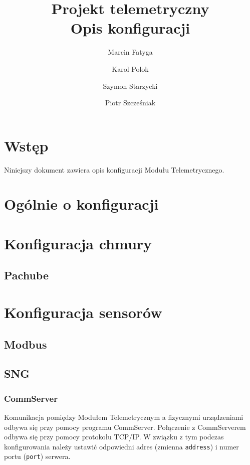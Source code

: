 \documentclass[11pt]{article}
\title{Projekt telemetryczny \\ Opis konfiguracji}
\author{Marcin Fatyga \and Karol Polok \and Szymon Starzycki \and Piotr Szcześniak}
\begin{document}
\begin{titlepage}

\maketitle

\thispagestyle{empty}
\end{titlepage}

\tableofcontents

\newpage

\section{Wstęp}
Niniejszy dokument zawiera opis konfiguracji Modułu Telemetrycznego.

\section{Ogólnie o konfiguracji}

\section{Konfiguracja chmury}

\subsection{Pachube}

\section{Konfiguracja sensorów}

\subsection{Modbus}

\subsection{SNG}

\subsubsection{CommServer}
Komunikacja pomiędzy Modułem Telemetrycznym a fizycznymi urządzeniami odbywa się przy pomocy
programu CommServer. Połączenie z CommServerem odbywa się przy pomocy protokołu TCP/IP.
W związku z tym podczas konfigurowania należy ustawić odpowiedni adres (zmienna \verb|address|)
i numer portu (\verb|port|) serwera.
\end{document}

